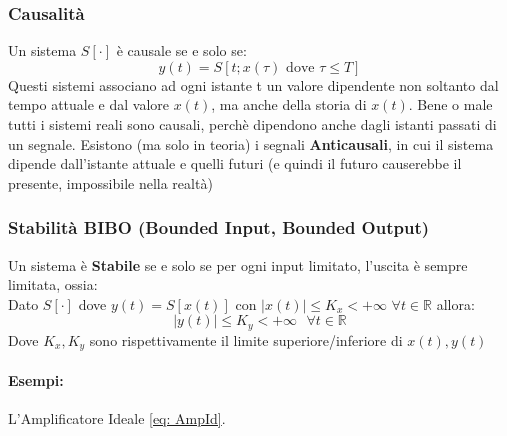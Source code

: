 \subsubsection{Causalità}
Un sistema $S[\cdot]$ è causale se e solo se:
\begin{equation}
    y(t) = S[t; x(\tau) \mbox{ dove } \tau \leq T]
\end{equation}
Questi sistemi associano ad ogni istante t un valore dipendente non soltanto dal tempo attuale e dal valore $x(t)$, ma 
anche della storia di $x(t)$. Bene o male tutti i sistemi reali sono causali, perchè dipendono anche dagli istanti passati di un segnale.
Esistono (ma solo in teoria) i segnali \textbf{Anticausali}, in cui il sistema dipende dall'istante attuale e quelli futuri (e quindi il futuro causerebbe il presente, impossibile nella realtà)

\subsubsection{Stabilità BIBO (Bounded Input, Bounded Output)}
Un sistema è \textbf{Stabile} se e solo se per ogni input limitato, l'uscita è sempre limitata, ossia:\\
Dato $S[\cdot]$ dove $y(t) = S[x(t)]$ con $|x(t)| \leq K_x < +\infty$  $\forall t \in \mathbb{R}$ allora:
\begin{equation}
    |y(t)| \leq K_y < +\infty \mbox{  } \forall t \in \mathbb{R}
\end{equation}
Dove $K_x,K_y$ sono rispettivamente il limite superiore/inferiore di $x(t),y(t)$
\paragraph{Esempi:} L'Amplificatore Ideale \eqref{eq: AmpId}.